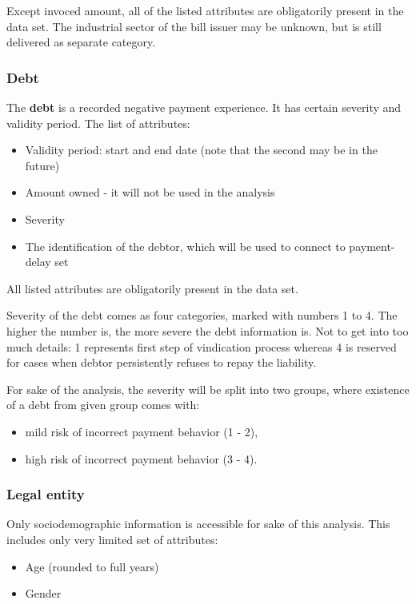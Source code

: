\documentclass{article}
\begin{document}
Except invoced amount, all of the listed attributes are obligatorily present in the data set.
The industrial sector of the bill issuer may be unknown, but is still delivered as separate category.

\subsubsection{Debt}
\label{section:intro-debt}

The \textbf{debt} is a recorded negative payment experience. It has certain severity and validity period.
The list of attributes:
\begin{itemize}
    \item Validity period: start and end date (note that the second may be in the future)
    \item Amount owned - it will not be used in the analysis
    \item Severity
    \item The identification of the debtor, which will be used to connect to payment-delay set
\end{itemize}

All listed attributes are obligatorily present in the data set.\par
Severity of the debt comes as four categories, marked with numbers 1 to 4. The higher the number is,
the more severe the debt information is. Not to get into too much details:
1 represents first step of vindication process whereas 4 is reserved for cases when
debtor persistently refuses to repay the liability.\par
For sake of the analysis, the severity will be split into two groups, where existence of a debt from given group comes with:
\begin{itemize}
    \item mild risk of incorrect payment behavior (1 - 2),
    \item high risk of incorrect payment behavior (3 - 4).
\end{itemize}

\subsubsection{Legal entity}

Only sociodemographic information is accessible for sake of this analysis. 
This includes only very limited set of attributes:

\begin{itemize}
    \item Age (rounded to full years)
    \item Gender
\end{itemize}
\end{document}
